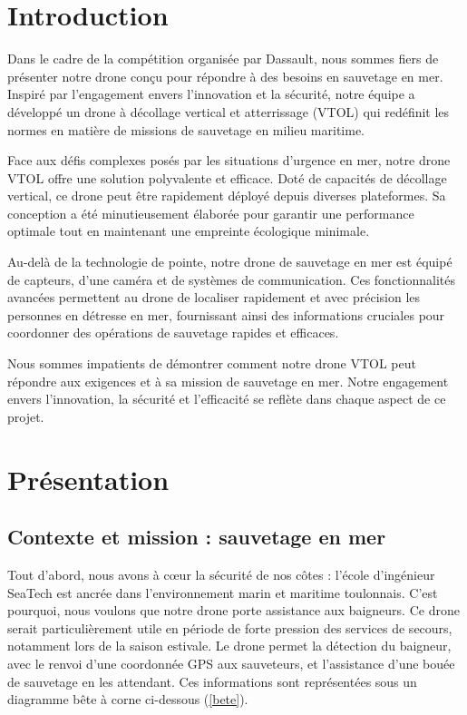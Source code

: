 \documentclass[a4paper,12pt,french]{report}
\begin{document}
\chapter*{Introduction}

Dans le cadre de la compétition organisée par Dassault, nous sommes fiers de présenter notre drone conçu pour répondre à des besoins en sauvetage en mer. Inspiré par l'engagement envers l'innovation et la sécurité, notre équipe a développé un drone à décollage vertical et atterrissage (VTOL) qui redéfinit les normes en matière de missions de sauvetage en milieu maritime.\newline

Face aux défis complexes posés par les situations d'urgence en mer, notre drone VTOL offre une solution polyvalente et efficace. Doté de capacités de décollage vertical, ce drone peut être rapidement déployé depuis diverses plateformes. Sa conception a été minutieusement élaborée pour garantir une performance optimale tout en maintenant une empreinte écologique minimale.\newline

Au-delà de la technologie de pointe, notre drone de sauvetage en mer est équipé de capteurs, d’une caméra et de systèmes de communication. Ces fonctionnalités avancées permettent au drone de localiser rapidement et avec précision les personnes en détresse en mer, fournissant ainsi des informations cruciales pour coordonner des opérations de sauvetage rapides et efficaces.\newline

Nous sommes impatients de démontrer comment notre drone VTOL peut répondre aux exigences et à sa mission de sauvetage en mer. Notre engagement envers l'innovation, la sécurité et l'efficacité se reflète dans chaque aspect de ce projet.

\chapter{Présentation}

\section{Contexte et mission : sauvetage en mer}

Tout d'abord, nous avons à c\oe ur la sécurité de nos côtes : l’école d’ingénieur SeaTech est ancrée dans l’environnement marin et maritime toulonnais. C'est pourquoi, nous voulons que notre drone porte assistance aux baigneurs. Ce drone serait particulièrement utile en période de forte pression des services de secours, notamment lors de la saison estivale. Le drone permet la détection du baigneur, avec le renvoi d'une coordonnée GPS aux sauveteurs, et l'assistance d'une bouée de sauvetage en les attendant. Ces informations sont représentées sous un diagramme bête à corne ci-dessous (\ref{bete}).
\end{document}
